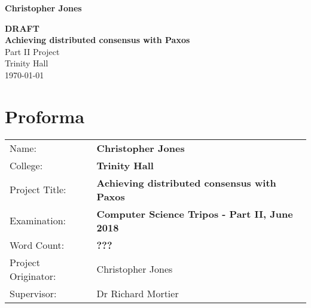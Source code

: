 \documentclass[12pt,twoside,notitlepage]{report}
\begin{document}





\pagestyle{empty}

\hfill{\LARGE \bf Christopher Jones}

\vspace*{60mm}
\begin{center}
\Huge
{\bf \color{red} DRAFT} \\
{\bf Achieving distributed consensus with Paxos} \\
\vspace*{5mm}
Part II Project \\
\vspace*{5mm}
Trinity Hall \\
\vspace*{5mm}
\today  %
\end{center}

\cleardoublepage



\setcounter{page}{1}
\pagestyle{plain}

\chapter*{Proforma}

{\large
\begin{tabular}{ll}
Name:                       & \bf Christopher Jones                       \\
College:                    & \bf Trinity Hall                     \\
Project Title:             & \bf Achieving distributed consensus with Paxos \\
Examination:            & \bf Computer Science Tripos - Part II, June 2018 \\
Word Count:            & \bf {\color{red}???} \footnotemark[1] \\
Project Originator:  & Christopher Jones                    \\
Supervisor:              & Dr Richard Mortier                    \\ 
\end{tabular}
}
\end{document}
